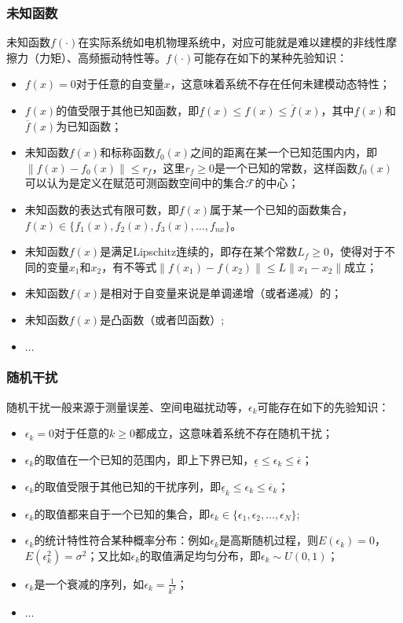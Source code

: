\subsubsection{未知函数}\label{subsubsect:2.2.2.2}
未知函数$f(\cdot)$在实际系统如电机物理系统中，对应可能就是难以建模的非线性摩擦力（力矩）、高频振动特性等。$f(\cdot)$可能存在如下的某种先验知识：
\begin{itemize}
\item $f(x)=0$对于任意的自变量$x$，这意味着系统不存在任何未建模动态特性；
\item $f(x)$的值受限于其他已知函数，即$\underline{f}(x)\leq f(x)\leq\overline{f}(x)$，其中$\underline{f}(x)$和$\overline{f}(x)$为已知函数；
\item 未知函数$f(x)$和标称函数$f_{0}(x)$之间的距离在某一个已知范围内内，即$\|f(x)-f_{0}(x)\|\leq r_{f}$，这里$r_{f}\geq0$是一个已知的常数，这样函数$f_{0}(x)$可以认为是定义在赋范可测函数空间中的集合$\mathcal{F}$的中心；
\item 未知函数的表达式有限可数，即$f(x)$属于某一个已知的函数集合，$f(x)\in\{f_{1}(x),f_{2}(x),f_{3}(x),\dots,f_{nx}\}$。
\item 未知函数$f(x)$是满足Lipschitz连续的，即存在某个常数$L_{f}\geq0$，使得对于不同的变量$x_{1}$和$x_{2}$，有不等式$\|f(x_{1})-f(x_{2})\|\leq L\|x_{1}-x_{2}\|$成立；
\item 未知函数$f(x)$是相对于自变量来说是单调递增（或者递减）的；
\item 未知函数$f(x)$是凸函数（或者凹函数）;
\item $\dots$
\end{itemize}
\subsubsection{随机干扰}\label{subsubsect:2.2.2.3}
随机干扰一般来源于测量误差、空间电磁扰动等，$\epsilon_{k}$可能存在如下的先验知识：
\begin{itemize}%
\item $\epsilon_{k}=0$对于任意的$k\geq0$都成立，这意味着系统不存在随机干扰；
\item $\epsilon_{k}$的取值在一个已知的范围内，即上下界已知，$\underline{\epsilon}\leq\epsilon_{k}\leq\overline{\epsilon}$；
\item $\epsilon_{k}$的取值受限于其他已知的干扰序列，即$\underline{\epsilon}_{k}\leq\epsilon_{k}\leq\overline{\epsilon}_{k}$；
\item $\epsilon_{k}$的取值都来自于一个已知的集合，即$\epsilon_{k}\in\{\epsilon_{1}, \epsilon_{2},\ldots,\epsilon_{N}\}$;
\item $\epsilon_{k}$的统计特性符合某种概率分布：例如$\epsilon_{k}$是高斯随机过程，则$E(\epsilon_{k})=0$，$E(\epsilon_{k}^{2})=\sigma^{2}$；又比如$\epsilon_{k}$的取值满足均匀分布，即$\epsilon_{k}\sim U(0,1)$；
\item $\epsilon_{k}$是一个衰减的序列，如$\epsilon_{k}=\frac1{k^{2}}$；
\item $\dots$
\end{itemize}

